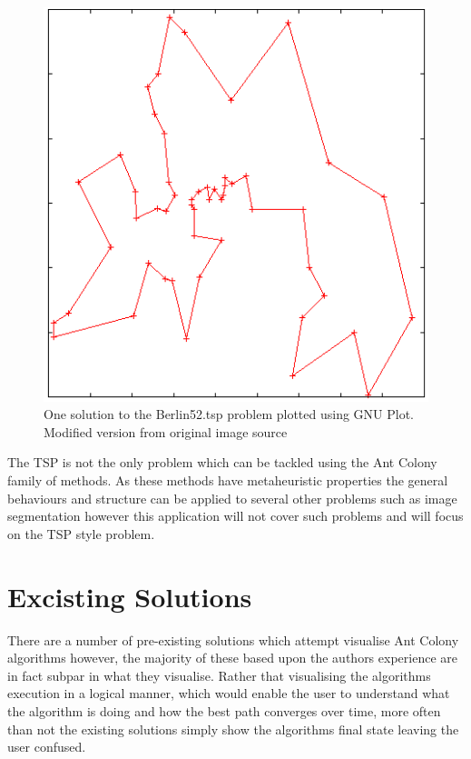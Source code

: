 \begin{figure}[h!]
\centering
\includegraphics[scale=0.7]{Images/chapter1/tsp52}
\caption{One solution to the Berlin52.tsp problem plotted using GNU Plot. Modified version from original image source \cite{berlin52:image}}
\label{fig:berlin52}
\end{figure}

The TSP is not the only problem which can be tackled using the Ant Colony family of methods. As these methods have metaheuristic properties the general behaviours and structure can be applied to several other problems such as image segmentation however this application will not cover such problems and will focus on the TSP style problem.

\section{Excisting Solutions}
\label{existingsolutions}
There are a number of pre-existing solutions which attempt visualise Ant Colony algorithms however, the majority of these based upon the authors experience are in fact subpar in what they visualise. Rather that visualising the algorithms execution in a logical manner, which would enable the user to understand what the algorithm is doing and how the best path converges over time, more often than not the existing solutions simply show the algorithms final state leaving the user confused.

